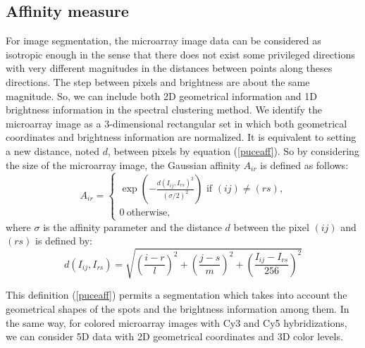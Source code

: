 \documentclass[]{svmult}
\begin{document}
\vspace{-0.5cm}
\subsection{Affinity measure}
\vspace{-0.3cm}

For image segmentation, the microarray image data can be considered as
isotropic enough in the sense that there does not exist some privileged
directions with very different magnitudes in the distances between points
along theses directions.  The step between pixels and brightness are about the
same magnitude. So, we can include both 2D geometrical information and 1D
brightness information in the spectral clustering method. We identify the
microarray image as a 3-dimensional rectangular set in which both geometrical
coordinates and brightness information are normalized. It is equivalent to
setting a
new distance, noted $d$, between pixels by equation (\ref{puceaff}).
So by considering the size of the microarray image, the Gaussian affinity
$A_{ir}$ is defined as follows:
\begin{equation}
A_{ir}=\begin{cases}
\exp\left(-\frac{d\left(I_{ij},I_{rs}\right)^2}{(\sigma/2)^2}\right) \text{\  if $(ij)\neq (rs)$,}\\ \label{defaff}
0 \ \text{otherwise,} 
\end{cases}
\end{equation}
where $\sigma$ is the affinity parameter and  the distance $d$ between the pixel $(ij)$ and $(rs)$ is defined by:
\begin{equation}
d\left(I_{ij},I_{rs}\right)=\sqrt{\left(\frac{i-r}{l}\right)^2+\left(\frac{j-s}{m}\right)^2+\left(\frac{I_{ij}-I_{rs}}{256}\right)^2}
\label{puceaff}
\end{equation}


This definition (\ref{puceaff}) permits a segmentation which takes into
account the geometrical shapes of the spots and the brightness information
among them. In the same way, for colored microarray images with  Cy3 and Cy5
hybridizations, we can consider 5D data with 2D geometrical coordinates and 3D
color levels.
\end{document}
